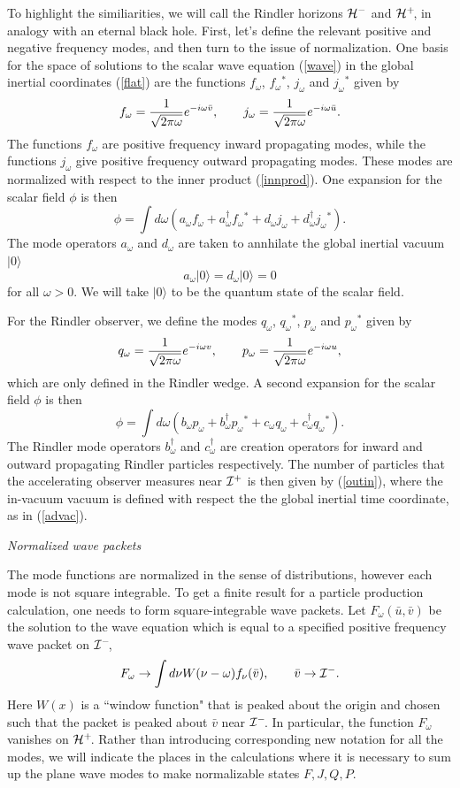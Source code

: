 \documentclass[12pt]{article}
\newcommand{\be}{\begin{equation}}
\newcommand{\ee}{\end{equation}}
\newcommand{\p}{\partial}
\def\fh{{\cal H}^+}
\def\ph{{\cal H}^-}
\def\finf{{\cal I}^+}
\def\pinf{{\cal I}^-}
\def\f{f_{\omega}}
\def\p{p_{\omega}}
\def\q{q_{\omega}}
\def\j{j_{\omega}}
\def\a{a_\omega}
\def\b{b_{\omega}}
\def\bd{b^{\dagger}_{\omega} }
\def\c{c_{\omega}}
\def\cd{c^{\dagger}_{\omega} }
\def\d{d_{\omega}}
\def\ub{\bar u}
\def\vb{\bar v}
\begin{document}
To highlight the similiarities, we will call the Rindler horizons $\ph$
and $\fh\!$, in analogy with an eternal black hole.
First, let's define the relevant  positive and negative
frequency modes, and then turn to the issue of normalization. One basis
for the space of solutions to the scalar wave equation (\ref{wave}) in the
global inertial
coordinates (\ref{flat}) are the functions $\f$, $\f{}^*$, $\j$ and
$\j{}^*$ given by
%
\be\label{minkmode}\f ={1\over \sqrt{2\pi \omega} }e^{-i\omega \vb }, \qquad
\j = {1\over \sqrt{2\pi \omega} }e^{-i\omega \ub } .\ee
%
The functions $\f$ are positive frequency inward propagating modes, while
the functions
$\j$ give positive frequency outward propagating modes. These modes are
normalized with respect to the inner product (\ref{innprod}).
One expansion for the scalar field $\phi$ is then
%
\be\label{rinphi}\phi = \int d\omega (  \a \f + \a^{\dagger} \f{}^*  +
\d \j + \d^{\dagger} \j{}^* ) .\ee
%
\goodbreak\noindent
The mode operators $\a$ and $\d$ are taken to annhilate the global inertial vacuum $|0\rangle$
%
\be\label{advac} \a |0\rangle = \d |0\rangle =0\ee
%
for all $\omega>0$.  We will take $|0\rangle$ to be the quantum state of the scalar
field.
%

%



For the Rindler observer, we define the modes $\q$, $\q{}^*$,
$\p$ and $\p{}^*$ given by
%
\be\label{rinmode} \q ={1\over \sqrt{2\pi \omega} }e^{-i\omega v } ,\qquad
\p = {1\over \sqrt{2\pi \omega} }e^{-i\omega u } ,\ee
%
which are only defined in the Rindler wedge.
A second expansion for the scalar field $\phi$ is then
%
\be\label{rinphitwo}\phi = \int d\omega ( \b \p + \b^{\dagger} \p{}^*  +
\c \q + \c^{\dagger} \q{}^* ). \ee
%
The Rindler mode operators $\bd$ and $\cd$ are creation operators for
inward and outward propagating Rindler particles respectively. The number
of particles that
the accelerating observer measures near $\finf$ is then given by
(\ref{outin}),  where the
in-vacuum vacuum is  defined with respect the the global inertial time
coordinate, as in
(\ref{advac}).

\vskip 0.1in\noindent
{\it Normalized wave packets}
\vskip 0.05in

The mode functions are normalized in the sense of distributions,
however each mode is not square integrable. To get a finite result for a
particle production calculation, one needs to form square-integrable wave
packets.
Let $F_{\omega}(\ub ,\vb )$ be the solution to the wave equation which is
equal to  a specified positive frequency wave packet on $\pinf\!$,
%
\be\label{packet}F_{\omega}\rightarrow \int d\nu W(\nu -\omega )f_{\nu}
(\vb ),\qquad
\vb \rightarrow \pinf.\ee
%
Here $W(x)$ is a ``window function" that is
peaked about the origin and chosen such that the packet is peaked
about $\vb$ near $\pinf\!$. In particular, the function $F_{\omega}$ vanishes
on $\fh\!$.
Rather than introducing corresponding new notation for all the modes, we
will indicate the
places in the calculations where it is necessary to sum up the plane wave
modes to make
normalizable states $F,J,Q,P$.
\end{document}
